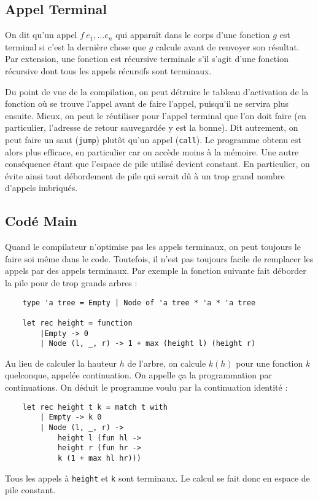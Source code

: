 \documentclass{cours}
\begin{document}
\subsection{Appel Terminal}
\begin{definition}
    On dit qu'un appel $f\ e_{1}, \ldots e_{n}$ qui apparaît dans le corps d'une fonction $g$ est terminal si c'est la dernière chose que $g$ calcule avant de renvoyer son résultat. Par extension, une fonction est récursive terminale s'il s'agit d'une fonction récursive dont tous les appels récursifs sont terminaux.
\end{definition}

Du point de vue de la compilation, on peut détruire le tableau d'activation de la fonction où se trouve l'appel avant de faire l'appel, puisqu'il ne servira plus ensuite. Mieux, on peut le réutiliser pour l'appel terminal que l'on doit faire (en particulier, l'adresse de retour sauvegardée y est la bonne). Dit autrement, on peut faire un saut (\texttt{jump}) plutôt qu'un appel (\texttt{call}).
Le programme obtenu est alors plus efficace, en particulier car on accède moins à la mémoire. Une autre conséquence étant que l'espace de pile utilisé devient constant. En particulier, on évite ainsi tout débordement de pile qui serait dû à un trop grand nombre d'appels imbriqués.

\subsection{Codé Main}
Quand le compilateur n'optimise pas les appels terminaux, on peut toujours le faire soi même dans le code. Toutefois, il n'est pas toujours facile de remplacer les appels par des appels terminaux. 
Par exemple la fonction suivante fait déborder la pile pour de trop grands arbres : 
\begin{verbatim}
    type 'a tree = Empty | Node of 'a tree * 'a * 'a tree

    let rec height = function 
        |Empty -> 0
        | Node (l, _, r) -> 1 + max (height l) (height r)
\end{verbatim}

Au lieu de calculer la hauteur $h$ de l'arbre, on calcule $k(h)$ pour une fonction $k$ quelconque, appelée continuation. On appelle ça la programmation par continuations. On déduit le programme voulu par la continuation identité : 

\begin{verbatim}
    let rec height t k = match t with 
        | Empty -> k 0
        | Node (l, _, r) -> 
            height l (fun hl ->
            height r (fun hr ->
            k (1 + max hl hr)))
\end{verbatim}
Tous les appels à \texttt{height} et \texttt{k} sont terminaux. Le calcul se fait donc en espace de pile constant. 
\end{document}
